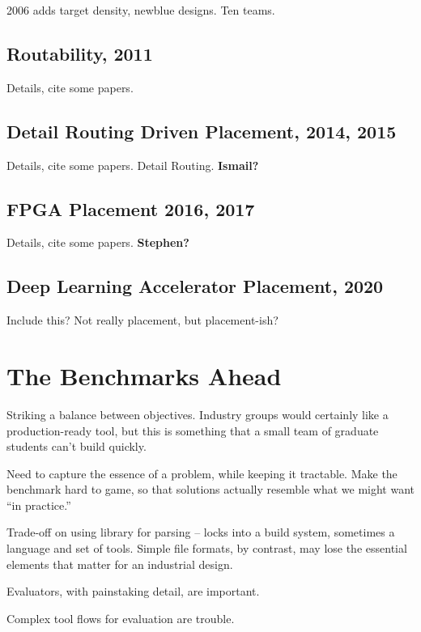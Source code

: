 \documentclass[sigconf]{acmart}
\begin{document}
2006 adds target density, newblue designs.  Ten teams.  

\subsection{Routability, 2011}


Details, cite some papers.

\subsection{Detail Routing Driven Placement, 2014, 2015}

Details, cite some papers.
Detail Routing.
{\bf Ismail?}



\subsection{FPGA Placement 2016, 2017}

Details, cite some papers.
{\bf Stephen?}


\subsection{Deep Learning Accelerator Placement, 2020}

Include this?  Not really placement, but placement-ish?


\section{The Benchmarks Ahead}

Striking a balance between objectives.  Industry groups
would certainly like a production-ready tool, but this is
something that a small team of graduate students can't
build quickly.

Need to capture the essence of a problem, while keeping it
tractable.  Make the benchmark hard to game, so that solutions
actually resemble what we might want ``in practice.''

Trade-off on using library for parsing -- locks into a build
system, sometimes a language and set of tools.  Simple
file formats, by contrast, may lose the essential elements
that matter for an industrial design.

Evaluators, with painstaking detail, are important.

Complex tool flows for evaluation are trouble.
\end{document}
